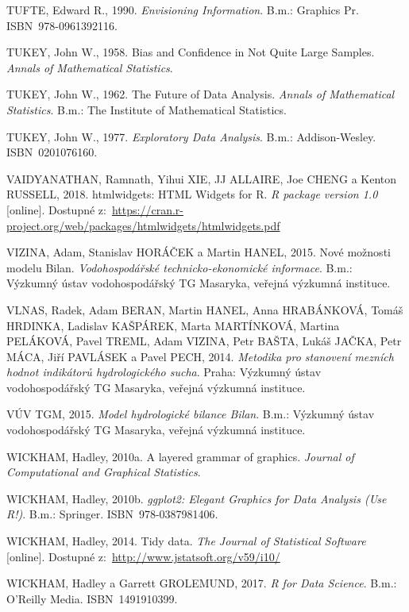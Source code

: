 \documentclass[12pt,]{article}
\begin{document}
\hypertarget{ref-tufte1990}{}
TUFTE, Edward R., 1990. \emph{Envisioning Information}. B.m.: Graphics
Pr. ISBN~978-0961392116.

\hypertarget{ref-jackknife_tukey}{}
TUKEY, John W., 1958. Bias and Confidence in Not Quite Large Samples.
\emph{Annals of Mathematical Statistics}.

\hypertarget{ref-tukey1962}{}
TUKEY, John W., 1962. The Future of Data Analysis. \emph{Annals of
Mathematical Statistics}. B.m.: The Institute of Mathematical
Statistics.

\hypertarget{ref-tukey1977}{}
TUKEY, John W., 1977. \emph{Exploratory Data Analysis}. B.m.:
Addison-Wesley. ISBN~0201076160.

\hypertarget{ref-htmlwidgets}{}
VAIDYANATHAN, Ramnath, Yihui XIE, JJ ALLAIRE, Joe CHENG a Kenton
RUSSELL, 2018. htmlwidgets: HTML Widgets for R. \emph{R package version
1.0} {[}online{]}. Dostupné
z:~\url{https://cran.r-project.org/web/packages/htmlwidgets/htmlwidgets.pdf}

\hypertarget{ref-bilan}{}
VIZINA, Adam, Stanislav HORÁČEK a Martin HANEL, 2015. Nové možnosti
modelu Bilan. \emph{Vodohospodářské technicko-ekonomické informace}.
B.m.: Výzkumný ústav vodohospodářský TG Masaryka, veřejná výzkumná
instituce.

\hypertarget{ref-sucho}{}
VLNAS, Radek, Adam BERAN, Martin HANEL, Anna HRABÁNKOVÁ, Tomáš HRDINKA,
Ladislav KAŠPÁREK, Marta MARTÍNKOVÁ, Martina PELÁKOVÁ, Pavel TREML, Adam
VIZINA, Petr BAŠTA, Lukáš JAČKA, Petr MÁCA, Jiří PAVLÁSEK a Pavel PECH,
2014. \emph{Metodika pro stanovení mezních hodnot indikátorů
hydrologického sucha}. Praha: Výzkumný ústav vodohospodářský TG
Masaryka, veřejná výzkumná instituce.

\hypertarget{ref-bilan_man}{}
VÚV TGM, 2015. \emph{Model hydrologické bilance Bilan}. B.m.: Výzkumný
ústav vodohospodářský TG Masaryka, veřejná výzkumná instituce.

\hypertarget{ref-layered-grammar}{}
WICKHAM, Hadley, 2010a. A layered grammar of graphics. \emph{Journal of
Computational and Graphical Statistics}.

\hypertarget{ref-wickham_ggplot}{}
WICKHAM, Hadley, 2010b. \emph{ggplot2: Elegant Graphics for Data
Analysis (Use R!)}. B.m.: Springer. ISBN~978-0387981406.

\hypertarget{ref-tidydata}{}
WICKHAM, Hadley, 2014. Tidy data. \emph{The Journal of Statistical
Software} {[}online{]}. Dostupné
z:~\url{http://www.jstatsoft.org/v59/i10/}

\hypertarget{ref-grolemund_wickham2017}{}
WICKHAM, Hadley a Garrett GROLEMUND, 2017. \emph{R for Data Science}.
B.m.: O'Reilly Media. ISBN~1491910399.
\end{document}

